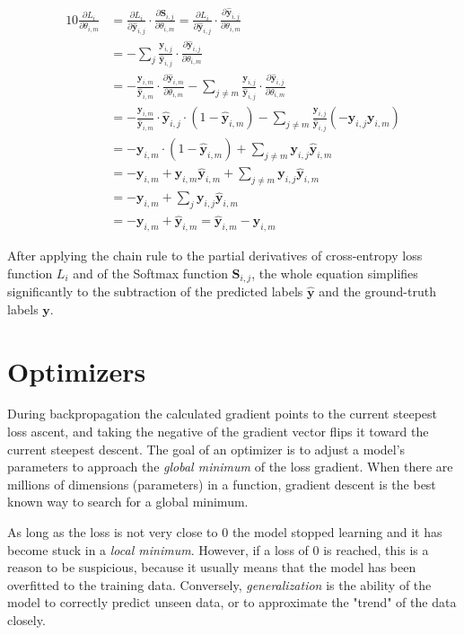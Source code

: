 \documentclass[a4paper]{article}
\newcommand{\matr}[1]{\mathbf{#1}}
\newcommand{\vect}[1]{\bm{#1}}
\newcommand{\yij}{\vect{y}_{i,j}}
\newcommand{\yhatij}{\vect{\hat{y}}_{i,j}}
\begin{document}
\begin{alignat*}{10}
    \frac{\partial L_i}{\partial \theta_{i,m}} &= \frac{\partial L_i}{\partial \yhatij} \cdot \frac{\partial \matr{S}_{i,j}}{\partial \theta_{i,m}} = \frac{\partial L_i}{\partial \yhatij} \cdot \frac{\partial \yhatij}{\partial \theta_{i,m}} \\
    &= -\sum_{j}\frac{\yij}{\yhatij} \cdot \frac{\partial \yhatij}{\partial \theta_{i,m}} \\
    &= -\frac{\vect{y}_{i,m}}{\vect{\hat{y}}_{i,m}} \cdot \frac{\partial \vect{\hat{y}}_{i,m}}{\partial \theta_{i,m}} - \sum_{j\not=m}\frac{\yij}{\yhatij} \cdot \frac{\partial\yhatij}{\partial\theta_{i,m}} \\
    &= -\frac{\vect{y}_{i,m}}{\vect{\hat{y}}_{i,m}} \cdot \yhatij \cdot (1 - \vect{\hat{y}}_{i,m}) - \sum_{j\not=m}\frac{\yij}{\yhatij}(-\yij\vect{y}_{i,m}) \\
    &= -\vect{y}_{i,m} \cdot (1 - \vect{\hat{y}}_{i,m}) + \sum_{j\not=m}\yij\vect{\hat{y}}_{i,m} \\
    &= -\vect{y}_{i,m} + \vect{y}_{i,m} \vect{\hat{y}}_{i,m} + \sum_{j\not=m}\yij\vect{\hat{y}}_{i,m} \\
    &= -\vect{y}_{i,m} + \sum_{j}\yij\vect{\hat{y}}_{i,m} \\
    &= -\vect{y}_{i,m} + \vect{\hat{y}}_{i,m} = \vect{\hat{y}}_{i,m} - \vect{y}_{i,m}
\end{alignat*}

After applying the chain rule to the partial derivatives of cross-entropy loss function $L_i$ and of the Softmax function $\matr{S}_{i,j}$, the whole equation simplifies significantly to the subtraction of the predicted labels $\vect{\hat{y}}$ and the ground-truth labels $\vect{y}$.

\section*{Optimizers}
During backpropagation the calculated gradient points to the current steepest loss ascent, and taking the negative of the gradient vector flips it toward the current steepest descent. The goal of an optimizer is to adjust a model's parameters to approach the \emph{global minimum} of the loss gradient. When there are millions of dimensions (parameters) in a function, gradient descent is the best known way to search for a global minimum.

As long as the loss is not very close to 0 the model stopped learning and it has become stuck in a \emph{local minimum}. However, if a loss of 0 is reached, this is a reason to be suspicious, because it usually means that the model has been overfitted to the training data. Conversely, \emph{generalization} is the ability of the model to correctly predict unseen data, or to approximate the "trend" of the data closely.
\end{document}
